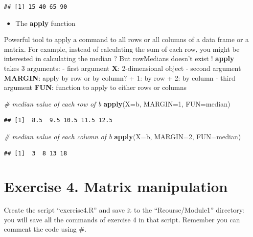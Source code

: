 \documentclass[]{book}
\newenvironment{Shaded}{\begin{snugshade}}{\end{snugshade}}
\newcommand{\CommentTok}[1]{\textcolor[rgb]{0.56,0.35,0.01}{\textit{#1}}}
\newcommand{\DataTypeTok}[1]{\textcolor[rgb]{0.13,0.29,0.53}{#1}}
\newcommand{\DecValTok}[1]{\textcolor[rgb]{0.00,0.00,0.81}{#1}}
\newcommand{\KeywordTok}[1]{\textcolor[rgb]{0.13,0.29,0.53}{\textbf{#1}}}
\newcommand{\NormalTok}[1]{#1}
\providecommand{\tightlist}{%
  \setlength{\itemsep}{0pt}\setlength{\parskip}{0pt}}
\begin{document}
\begin{verbatim}
## [1] 15 40 65 90
\end{verbatim}

\begin{itemize}
\tightlist
\item
  The \textbf{apply} function
\end{itemize}

Powerful tool to apply a command to all rows or all columns of a data frame or a matrix.
For example, instead of calculating the sum of each row, you might be interested in calculating the median ? But rowMedians doesn't exist !
\textbf{apply} takes 3 arguments:
- first argument \textbf{X}: 2-dimensional object
- second argument \textbf{MARGIN}: apply by row or by column?
+ 1: by row
+ 2: by column
- third argument \textbf{FUN}: function to apply to either rows or columns

\begin{Shaded}
\begin{Highlighting}[]
\CommentTok{# median value of each row of b}
\KeywordTok{apply}\NormalTok{(}\DataTypeTok{X=}\NormalTok{b, }\DataTypeTok{MARGIN=}\DecValTok{1}\NormalTok{, }\DataTypeTok{FUN=}\NormalTok{median)}
\end{Highlighting}
\end{Shaded}

\begin{verbatim}
## [1]  8.5  9.5 10.5 11.5 12.5
\end{verbatim}

\begin{Shaded}
\begin{Highlighting}[]
\CommentTok{# median value of each column of b}
\KeywordTok{apply}\NormalTok{(}\DataTypeTok{X=}\NormalTok{b, }\DataTypeTok{MARGIN=}\DecValTok{2}\NormalTok{, }\DataTypeTok{FUN=}\NormalTok{median)}
\end{Highlighting}
\end{Shaded}

\begin{verbatim}
## [1]  3  8 13 18
\end{verbatim}

\hypertarget{exercise-4.-matrix-manipulation}{%
\section{Exercise 4. Matrix manipulation}\label{exercise-4.-matrix-manipulation}}

Create the script ``exercise4.R'' and save it to the ``Rcourse/Module1'' directory: you will save all the commands of exercise 4 in that script.
Remember you can comment the code using \#.
\end{document}
